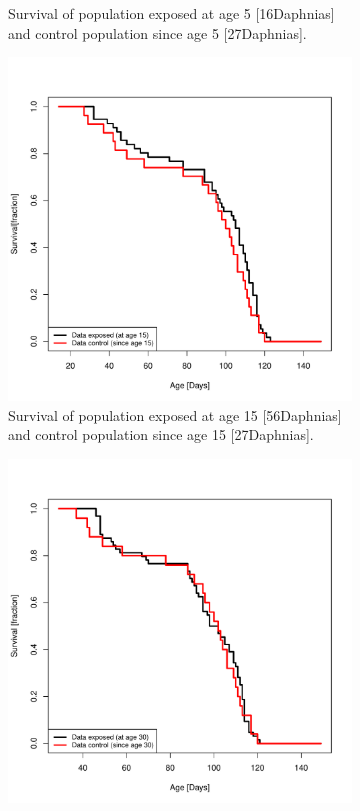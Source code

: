 \documentclass[10pt]{article}         %
\begin{document}
\begin{figure}[H]
\begin{subfigure}[b]{0.6\textwidth}
    \caption{Survival of population exposed at age 5 [16Daphnias] and control population since age 5 [27Daphnias].}
    \label{fig:subfigure_2}
  \end{subfigure}
  \begin{subfigure}[b]{0.6\textwidth}
    \includegraphics[width=\textwidth]{Survival_data_aai_15.pdf}
    \caption{Survival of population exposed at age 15 [56Daphnias] and control population since age 15 [27Daphnias].}
    \label{fig:subfigure_3}
  \end{subfigure}
  \begin{subfigure}[b]{0.6\textwidth}
    \includegraphics[width=\textwidth]{Survival_data_aai_30.pdf}

\end{subfigure}
\end{figure}
\end{document}
